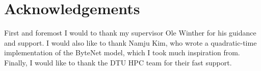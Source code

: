 \chapter{Acknowledgements}
First and foremost I would to thank my supervisor Ole Winther for his guidance and support. I would also like to thank Namju Kim, who wrote a quadratic-time implementation of the ByteNet model, which I took much inspiration from. Finally, I would like to thank the DTU HPC team for their fast support.